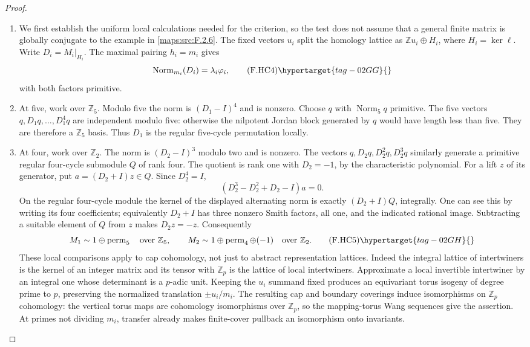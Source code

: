\begin{proof}
\begin{enumerate}[label={$\langle1\rangle$\arabic*.}]
\item We first establish the uniform local calculations needed
for the criterion, so the test does not assume that a
general finite matrix is globally conjugate to the example
in \ref{maps:src:F.2.6}.
The fixed vectors $u_i$ split the homology lattice as
$\mathbb Zu_i\oplus H_i$, where $H_i=\ker\ell$.
Write $D_i=M_i|_{H_i}$.
The maximal pairing $h_i=m_i$ gives
\[
 \operatorname{Norm}_{m_i}(D_i)=\lambda_i\varphi_i ,
 \tag{F.HC4}\hypertarget{tag-02GG}{}\label{maps:eq:F.HC4}
\]
with both factors primitive.

\item At five, work over $\mathbb Z_5$.
Modulo five the norm is $(D_1-I)^4$ and is nonzero.
Choose $q$ with $\operatorname{Norm}_5q$ primitive.
The five vectors $q,D_1q,\ldots,D_1^4q$ are independent
modulo five: otherwise the nilpotent Jordan block generated
by $q$ would have length less than five.
They are therefore a $\mathbb Z_5$ basis.
Thus $D_1$ is the regular five-cycle permutation locally.

\item At four, work over $\mathbb Z_2$.
The norm is $(D_2-I)^3$ modulo two and is nonzero.
The vectors $q,D_2q,D_2^2q,D_2^3q$ similarly generate
a primitive regular four-cycle submodule $Q$ of rank four.
The quotient is rank one with $D_2=-1$, by the
characteristic polynomial.
For a lift $z$ of its generator, put $a=(D_2+I)z\in Q$.
Since $D_2^4=I$,
\[
 (D_2^3-D_2^2+D_2-I)a=0.
\]
On the regular four-cycle module the kernel of the
displayed alternating norm is exactly $(D_2+I)Q$,
integrally.  One can see this by writing its four
coefficients; equivalently $D_2+I$ has three nonzero
Smith factors, all one, and the indicated rational image.
Subtracting a suitable element of $Q$ from $z$ makes
$D_2z=-z$.
Consequently
\[
 M_1\sim 1\oplus\operatorname{perm}_5\quad\text{over }\mathbb Z_5,
 \qquad
 M_2\sim1\oplus\operatorname{perm}_4\oplus(-1)
 \quad\text{over }\mathbb Z_2 .
 \tag{F.HC5}\hypertarget{tag-02GH}{}\label{maps:eq:F.HC5}
\]
These local comparisons apply to cap cohomology, not just
to abstract representation lattices.
Indeed the integral lattice of intertwiners is the kernel
of an integer matrix and its tensor with $\mathbb Z_p$
is the lattice of local intertwiners.
Approximate a local invertible intertwiner by an integral
one whose determinant is a $p$-adic unit.
Keeping the $u_i$ summand fixed produces an equivariant
torus isogeny of degree prime to $p$, preserving the
normalized translation $\pm u_i/m_i$.
The resulting cap and boundary coverings induce
isomorphisms on $\mathbb Z_p$ cohomology: the vertical
torus maps are cohomology isomorphisms over $\mathbb Z_p$,
so the mapping-torus Wang sequences give the assertion.
At primes not dividing $m_i$, transfer already makes
finite-cover pullback an isomorphism onto invariants.


\end{enumerate}
\end{proof}
